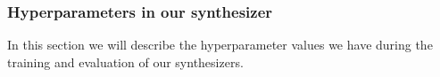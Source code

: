 \documentclass{article}
\begin{document}
\subsubsection{Hyperparameters in our synthesizer}

In this section we will describe the hyperparameter values we have during the training and evaluation of our synthesizers.

\end{document}

